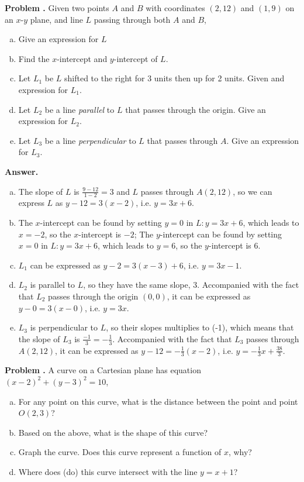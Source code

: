 \documentclass[11pt,letterpaper]{article}
\newcounter{problem}
\newcommand{\problem}{
	\stepcounter{problem}%
	\noindent \textbf{Problem \theproblem. }%
}
\newcommand{\answer}{\noindent \textbf{Answer. }}
\begin{document}
\problem Given two points $A$ and $B$ with coordinates $(2, 12)$ and $(1, 9)$ on an $x$-$y$ plane, and line $L$ passing through both $A$ and $B$,
	\begin{enumerate}[(a)]
	\item Give an expression for $L$
	\item Find the $x$-intercept and $y$-intercept of $L$.
	\item Let $L_1$ be $L$ shifted to the right for 3 units then up for 2 units. Given and expression for $L_1$.
	\item Let $L_2$ be a line \textit{parallel} to $L$ that passes through the origin. Give an expression for $L_2$.
	\item Let $L_3$ be a line \textit{perpendicular} to $L$ that passes through $A$. Give an expression for $L_3$.
	\end{enumerate} \vspace{6mm}
	
\answer

\begin{enumerate}[(a)]
    \item The slope of $L$ is $\frac{9-12}{1-2} = 3$ and $L$ passes through $A(2,12)$, so we can express $L$ as $y-12 = 3(x-2)$, i.e. $y=3x+6$.
    \item The $x$-intercept can be found by setting $y=0$ in $L: y=3x+6$, which leads to $x=-2$, so the $x$-intercept is $-2$;  The $y$-intercept can be found by setting $x=0$ in $L: y=3x+6$, which leads to $y=6$, so the $y$-intercept is $6$.
    \item $L_1$ can be expressed as $y-2 = 3(x-3)+6$, i.e. $y = 3x-1$.
    \item $L_2$ is parallel to $L$, so they have the same slope, $3$.  Accompanied with the fact that $L_2$ passes through the origin $(0,0)$, it can be expressed as $y-0 = 3(x-0)$, i.e. $y=3x$.
    \item $L_3$ is perpendicular to $L$, so their slopes multiplies to (-1), which means that the slope of $L_3$ is $\frac{-1}{3} = -\frac{1}{3}$.  Accompanied with the fact that $L_3$ passes through $A(2,12)$, it can be expressed as $y-12 = -\frac{1}{3}(x-2)$, i.e. $y=-\frac{1}{3}x+\frac{38}{3}$.
\end{enumerate} \vspace{6mm}

\problem A curve on a Cartesian plane has equation $(x-2)^2+(y-3)^2 = 10$,
	\begin{enumerate}[(a)]
	\item For any point on this curve, what is the distance between the point and point $O(2, 3)$?
	\item Based on the above, what is the shape of this curve?
	\item Graph the curve. Does this curve represent a function of $x$, why?
	\item Where does (do) this curve intersect with the line $y = x + 1$?
	\end{enumerate} \vspace{6mm}
\end{document}
